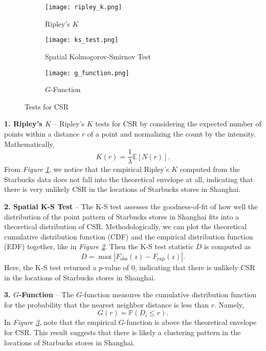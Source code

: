 \documentclass{article}
\begin{document}
\begin{figure}[htbp]
    \begin{subfigure}[b]{0.3\textwidth}
        \centering
        \texttt{[image: ripley\_k.png]}
        \caption{Ripley's \(K\)}
        \label{fig:ripley_k}
    \end{subfigure}
    \hfill
    \begin{subfigure}[b]{0.3\textwidth}
        \centering
        \texttt{[image: ks\_test.png]}
        \caption{Spatial Kolmogorov-Smirnov Test}
        \label{fig:ks_test}
    \end{subfigure}
    \hfill
    \begin{subfigure}[b]{0.3\textwidth}
        \centering
        \texttt{[image: g\_function.png]}
        \caption{\(G\)-Function}
        \label{fig:g_function}
    \end{subfigure}
    \caption{Tests for CSR}
    \label{fig:csr_tests}
\end{figure}

\textbf{1. Ripley's \(K\)} -- Ripley’s \(K\) tests for CSR by considering the expected number of points within a distance \(r\) of a point and normalizing the count by the intensity. Mathematically,
\[K(r) = \frac{1}{\lambda} \mathbb{E}[N(r)].\]
From \textit{Figure \ref{fig:ripley_k}}, we notice that the empirical Ripley's \(K\) computed from the Starbucks data does not fall into the theoretical envelope at all, indicating that there is very unlikely CSR in the locations of Starbucks stores in Shanghai.

\textbf{2. Spatial K-S Test} -- The K-S test assesses the goodness-of-fit of how well the distribution of the point pattern of Starbucks stores in Shanghai fits into a theoretical distribution of CSR. Methodologically, we can plot the theoretical cumulative distribution function (CDF) and the empirical distribution function (EDF) together, like in \textit{Figure \ref{fig:ks_test}}. Then the K-S test statistic \(D\) is computed as
\[D = \max |F_{\text{obs}}(z) - F_{\text{exp}}(z)|.\]
Here, the K-S test returned a \(p\)-value of 0, indicating that there is unlikely CSR in the locations of Starbucks stores in Shanghai.

\textbf{3. \(G\)-Function} -- The \(G\)-function measures the cumulative distribution function for the probability that the nearest neighbor distance is less than \(r\). Namely,
\[G(r) = \mathbb{P}(D_i \leq r).\]
In \textit{Figure \ref{fig:g_function}}, note that the empirical \(G\)-function is above the theoretical envelope for CSR. This result suggests that there is likely a clustering pattern in the locations of Starbucks stores in Shanghai.
\end{document}
